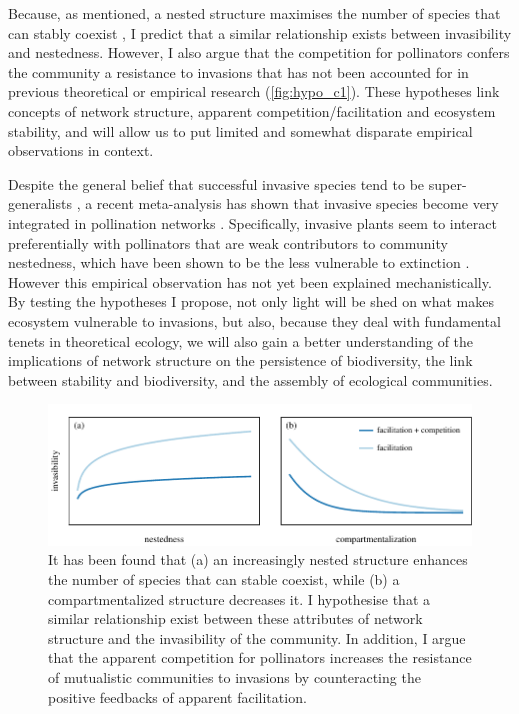 \documentclass[a4paper]{article}
\begin{document}
Because, as mentioned, a nested structure maximises the number of species that can stably coexist \autocite{Bastolla2009}, I predict that a similar relationship exists between invasibility and nestedness.
However, I also argue that the competition for pollinators confers the community a resistance to invasions that has not been accounted for in previous theoretical or empirical research (\autoref{fig:hypo_c1}).
These hypotheses link concepts of network structure, apparent competition/facilitation and ecosystem stability, and will allow us to put limited and somewhat disparate empirical observations in context.

Despite the general belief that successful invasive species tend to be super-generalists \autocite{Richardson2000, Aizen2008, Vila2009, Albrecht2014}, a recent meta-analysis has shown that invasive species become very integrated in pollination networks \autocite{Stouffer2014}.
Specifically, invasive plants seem to interact preferentially with pollinators that are weak contributors to community nestedness, which have been shown to be the less vulnerable to extinction \autocite{Saavedra2011, Stouffer2014}.
However this empirical observation has not yet been explained mechanistically.
By testing the hypotheses I propose, not only light will be shed on what makes ecosystem vulnerable to invasions, but also, because they deal with fundamental tenets in theoretical ecology, we will also gain a better understanding of the implications of network structure on the persistence of biodiversity, the link between stability and biodiversity, and the assembly of ecological communities.

\begin{figure}[tbp]
  \includegraphics{hypo_c1}
  \caption{
  \label{fig:hypo_c1}
  It has been found that (a) an increasingly nested structure enhances the number of species that can stable coexist, while (b) a compartmentalized structure decreases it.
  I hypothesise that a similar relationship exist between these attributes of network structure and the invasibility of the community.
  In addition, I argue that the apparent competition for pollinators increases the resistance of mutualistic communities to invasions by counteracting the positive feedbacks of apparent facilitation.}
\end{figure}
\end{document}
